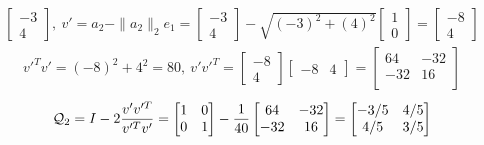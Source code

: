 \documentclass{article}
\newcommand{\twonorm}[1]{\| #1 \|_2}
\begin{document}
\begin{enumerate}
\begin{enumerate}
{\begin{align*}
\begin{bmatrix}
            -3 \\
            4
          \end{bmatrix} 
          , \:
          v' = a_2 - \twonorm{a_2}e_1
          =
          \begin{bmatrix}
            -3 \\
            4
          \end{bmatrix} 
          - \sqrt{ (-3)^2 + (4)^2}
          \begin{bmatrix}
          1 \\
          0
          \end{bmatrix}
          = 
          \begin{bmatrix}
            -8 \\
            4
          \end{bmatrix} 
      \end{align*}
      \begin{align*}
          v'^Tv' = (-8)^2 + 4^2 = 80 , \:
          v'v'^T = 
          \begin{bmatrix}
            -8 \\
            4
          \end{bmatrix}
          \begin{bmatrix}
            -8 & 4
          \end{bmatrix}
          =
          \begin{bmatrix}
            64 & -32 \\
            -32 & 16 \\
          \end{bmatrix}
      \end{align*}
      \begin{align*}
          \calQ_2 = I - 2 \frac{v'v'^T}{v'^Tv'} =
          \begin{bmatrix}
            1 & 0 \\
            0 & 1 \\
          \end{bmatrix}
          - \frac{1}{40}
          \begin{bmatrix}
            64 & -32 \\
            -32 & 16 \\
          \end{bmatrix} 
          =
          \begin{bmatrix}
            -3/5 & 4/5 \\
            4/5 & 3/5 \\
          \end{bmatrix}

\end{align*}}
\end{enumerate}
\end{enumerate}
\end{document}
